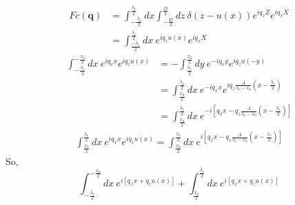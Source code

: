 \documentclass[letterpage]{article}
\begin{document}
\begin{align}
  Fc(\textbf{q}) &= \int_{-\frac{\lambda_r}{2}}^{\frac{\lambda_r}{2}}dx
  \int_{-\frac{D}{2}}^\frac{D}{2} dz \: \delta\left(z-u(x)\right)
  e^{iq_zZ} e^{iq_xX} \\
  &= \int_{\frac{-\lambda_r}{2}}^{\frac{\lambda_r}{2}} dx \: e^{iq_zu(x)}
  e^{iq_xX}
\end{align}
\begin{align}
  \int_{-\frac{\lambda_r}{2}}^{-\frac{x_0}{2}} dx \: e^{iq_xx} e^{iq_zu(x)}
  &= -\int_{\frac{\lambda_r}{2}}^{\frac{x_0}{2}} 
  dy \: e^{-iq_xy}e^{iq_zu(-y)}\\
  &= \int_{\frac{x_0}{2}}^{\frac{\lambda_r}{2}} dx \: e^{-iq_xx} 
  e^{iq_z\frac{A}{\lambda_r-x_0}\left(x-\frac{\lambda_r}{2}\right)}\\
  &= \int_{\frac{x_0}{2}}^{\frac{\lambda_r}{2}}dx \: 
  e^{-i\left[q_xx - q_z \frac{A}{\lambda_r-x_0}
  \left(x-\frac{\lambda_r}{2}\right)\right]}
\end{align}
\begin{align}
  \int_{\frac{x_0}{2}}^{\frac{\lambda_r}{2}} dx \: e^{iq_xx} e^{iq_zu(x)}
  = \int_{\frac{x_0}{2}}^{\frac{\lambda_r}{2}} dx \: 
  e^{i\left[q_xx-q_z\frac{A}{\lambda_r-x_0}
  \left(x-\frac{\lambda_r}{2}\right)\right]}
\end{align}
So,
\begin{equation}
  \int_{-\frac{\lambda_r}{2}}^{-\frac{x_0}{2}} dx \:
  e^{i{\left[q_xx+q_zu(x)\right]}}
  + \int_{\frac{x_0}{2}}^{\frac{\lambda_r}{2}} dx \: 
  e^{i\left[q_xx+q_zu(x)\right]}
\end{equation}
\end{document}
